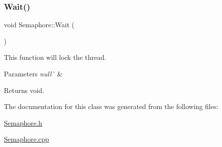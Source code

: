 \subsubsection{\texorpdfstring{Wait()}{Wait()}}
{\footnotesize\ttfamily void Semaphore\+::\+Wait (\begin{DoxyParamCaption}{ }\end{DoxyParamCaption})}



This function will lock the thread. 


\begin{DoxyParams}{Parameters}
{\em null\`{}} & \\
\hline
\end{DoxyParams}
\begin{DoxyReturn}{Returns}
void. 
\end{DoxyReturn}


The documentation for this class was generated from the following files\+:\begin{DoxyCompactItemize}
\item 
\mbox{\hyperlink{_semaphore_8h}{Semaphore.\+h}}\item 
\mbox{\hyperlink{_semaphore_8cpp}{Semaphore.\+cpp}}\end{DoxyCompactItemize}
